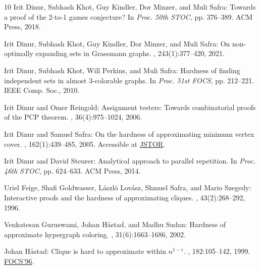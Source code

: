 \documentclass[11pt]{article}
\numberwithin{equation}{section}
\theoremstyle{definition}
\theoremstyle{plain}
\begin{document}
\begin{thebibliography}{10}
{\sc Irit Dinur, Subhash Khot, Guy Kindler, Dor Minzer, and Muli Safra}:
  Towards a proof of the 2-to-1 games conjecture?
\newblock In {\em Proc. 50th STOC}, pp. 376--389. ACM Press, 2018.
\newblock [\epfmtdoi{10.1145/3188745.3188804}]

{\sc Irit Dinur, Subhash Khot, Guy Kindler, Dor Minzer, and Muli Safra}: On
  non-optimally expanding sets in {G}rassmann graphs.
, 243(1):377--420, 2021.
\newblock [\epfmtdoi{10.1007/s11856-021-2164-7}]

{\sc Irit Dinur, Subhash Khot, Will Perkins, and Muli Safra}: Hardness of
  finding independent sets in almost 3-colorable graphs.
\newblock In {\em Proc. 51st FOCS}, pp. 212--221. IEEE Comp. Soc., 2010.

{\sc Irit Dinur and Omer Reingold}: Assignment testers: Towards combinatorial
  proofs of the {PCP} theorem.
, 36(4):975--1024, 2006.
\newblock [\epfmtdoi{10.1137/S0097539705446962}]

{\sc Irit Dinur and Samuel Safra}: On the hardness of approximating minimum
  vertex cover.
, 162(1):439--485, 2005.
\newblock Accessible at \href{http://www.jstor.org/stable/3597377}{JSTOR}.

{\sc Irit Dinur and David Steurer}: Analytical approach to parallel repetition.
\newblock In {\em Proc. 46th STOC}, pp. 624--633. ACM Press, 2014.
\newblock [\epfmtdoi{10.1145/2591796.2591884}]

{\sc Uriel Feige, Shafi Goldwasser, L{\'a}szl{\'o} Lov\'{a}sz, Shmuel Safra,
  and Mario Szegedy}: Interactive proofs and the hardness of approximating
  cliques.
, 43(2):268--292, 1996.
\newblock [\epfmtdoi{10.1145/226643.226652}]

{\sc Venkatesan Guruswami, Johan H{\aa}stad, and Madhu Sudan}: Hardness of
  approximate hypergraph coloring.
, 31(6):1663--1686, 2002.
\newblock [\epfmtdoi{10.1137/S0097539700377165}]

{\sc Johan H{\aa}stad}: Clique is hard to approximate within $n^{1-\epsilon}$.
, 182:105--142, 1999.
\newblock \prelim \href{https://doi.org/10.1109/SFCS.1996.548522}{FOCS'96}.
\newblock [\epfmtdoi{10.1007/BF02392825}]


\end{thebibliography}
\end{document}
